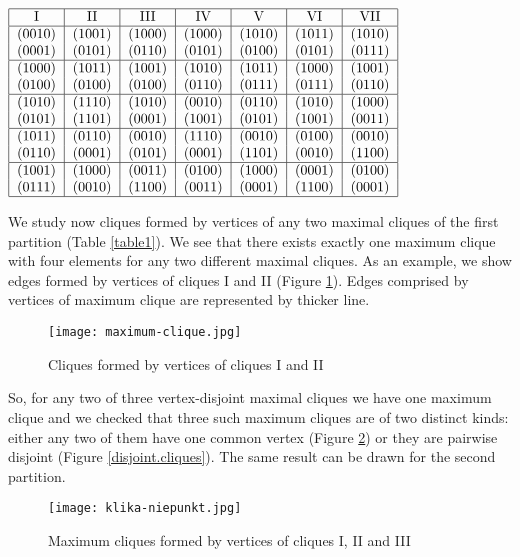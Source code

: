 \documentclass[12pt,a4paper]{article}
\theoremstyle{definition}
\begin{document}
\newpage
\begin{table}[ht]\centerline{$
\begin{tabular}{|c|c|c|c|c|c|c|}\hline
I&II&III&IV&V&VI&VII\\ \hline
 (0010) & (1001) & (1000) & (1000) & (1010) & (1011) & (1010)\\
(0001) & (0101) & (0110) & (0101) & (0100) & (0101) & (0111)\\ \hline
 (1000) & (1011) & (1001) & (1010) & (1011) & (1000) & (1001) \\
(0100) & (0100) & (0100) & (0110) & (0111) & (0111) & (0110)\\ \hline
(1010) & (1110) & (1010) & (0010) & (0110) & (1010) & (1000) \\
(0101) & (1101) & (0001) & (1001) & (0101) & (1001) & (0011)\\ \hline
(1011) & (0110) & (0010) & (1110) & (0010) & (0100) & (0010) \\
(0110) & (0001) & (0101) & (0001) & (1101) & (0010) & (1100)\\ \hline
(1001) & (1000) & (0011) & (0100) & (1000) & (0001) & (0100) \\
(0111) & (0010) & (1100) & (0011) & (0001) & (1100) & (0001)\\ \hline
\end{tabular} $}
\caption{Partition 2}
\label{table2}
\end{table}
We study now cliques formed by vertices of any two maximal cliques of the first partition (Table \ref{table1}). We see that there exists exactly one maximum clique with four elements for any two different maximal cliques. As an example, we show edges formed by vertices of cliques I and II (Figure \ref{najwiksza.klika}). Edges comprised by vertices of maximum clique are represented by thicker line.
\begin{figure}[h]
\centerline{\texttt{[image: maximum-clique.jpg]}}
\caption{Cliques formed by vertices of cliques I and II}
\label{najwiksza.klika}
\end{figure}
\newpage
So, for any two of three vertex-disjoint maximal cliques we have one maximum clique  and we checked that three such maximum cliques are of two distinct kinds: either any two of them have one common vertex (Figure \ref{nondisjoint.cliques}) or they are pairwise disjoint (Figure \ref{disjoint.cliques}). The same result can be drawn for the second partition. 
\begin{figure}[h]
\centerline{\texttt{[image: klika-niepunkt.jpg]}}
\caption{Maximum cliques formed by vertices of cliques I, II and III}
\label{nondisjoint.cliques}
\end{figure}
\end{document}
